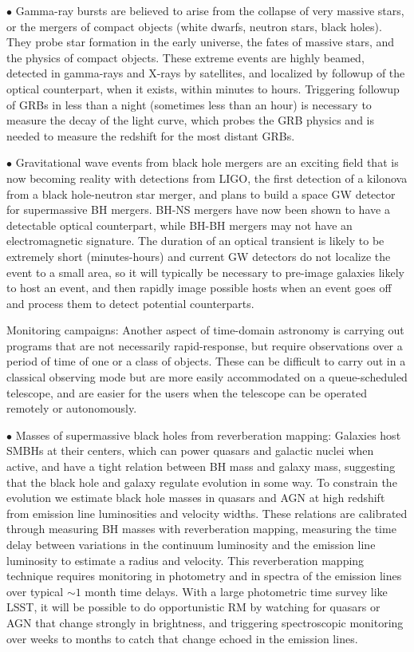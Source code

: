 \documentclass[]{spie}  %
\begin{document}
$\bullet$ Gamma-ray bursts are believed to arise from the collapse of very massive stars, or the mergers of compact objects (white dwarfs, neutron stars, black holes). They probe star formation in the early universe, the fates of massive stars, and the physics of compact objects. These extreme events are highly beamed, detected in gamma-rays and X-rays by satellites, and localized by followup of the optical counterpart, when it exists, within minutes to hours\cite{Fong16}. Triggering followup of GRBs in less than a night (sometimes less than an hour) is necessary to measure the decay of the light curve, which probes the GRB physics and is needed to measure the redshift for the most distant GRBs.  

$\bullet$ Gravitational wave events from black hole mergers are an exciting field that is now becoming reality with detections from LIGO, the first detection of a kilonova from a black hole-neutron star merger\cite{Soares-Santos17, Valenti17, Kilpatrick17}, and plans to build a space GW detector for supermassive BH mergers. BH-NS mergers have now been shown to have a detectable optical counterpart, while BH-BH mergers may not have an electromagnetic signature. The duration of an optical transient is likely to be extremely short (minutes-hours) and current GW detectors do not localize the event to a small area, so it will typically be necessary to pre-image galaxies likely to host an event, and then rapidly image possible hosts when an event goes off and process them to detect potential counterparts.

Monitoring campaigns: Another aspect of time-domain astronomy is carrying out programs that are not necessarily rapid-response, but require observations over a period of time of one or a class of objects. These can be difficult to carry out in a classical observing mode but are more easily accommodated on a queue-scheduled telescope, and are easier for the users when the telescope can be operated remotely or autonomously.

$\bullet$ Masses of supermassive black holes from reverberation mapping: Galaxies host SMBHs at their centers, which can power quasars and galactic nuclei when active, and have a tight relation between BH mass and galaxy mass, suggesting that the black hole and galaxy regulate evolution in some way. To constrain the evolution we estimate black hole masses in quasars and AGN at high redshift from emission line luminosities and velocity widths. These relations are calibrated through measuring BH masses with reverberation mapping, measuring the time delay between variations in the continuum luminosity and the emission line luminosity to estimate a radius and velocity. This reverberation mapping technique requires monitoring in photometry and in spectra of the emission lines over typical $\sim 1$ month time delays\cite{Grier17}. With a large photometric time survey like LSST, it will be possible to do opportunistic RM by watching for quasars or AGN that change strongly in brightness, and triggering spectroscopic monitoring over weeks to months to catch that change echoed in the emission lines. 
\end{document}
